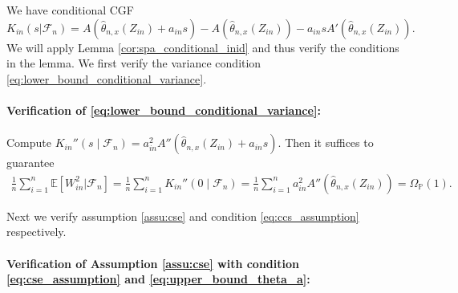 \documentclass[12pt]{article}
\theoremstyle{definition}
\def\P{\mathbb{P}}
\def\P{\mathbb{P}}
\newcommand{\E}{\mathbb E}								%
\renewcommand{\P}{\mathbb{P}}							%
\newcommand{\srz}{Z}									%
\begin{document}
We have conditional CGF 
\begin{equation}
K_{in}(s|\mathcal{F}_n) = A(\widehat \theta_{n,x}(\srz_{in})+a_{in}s)-A(\widehat \theta_{n,x}(\srz_{in}))-a_{in}sA'(\widehat \theta_{n,x}(\srz_{in})).
\end{equation}
We will apply Lemma \ref{cor:spa_conditional_inid} and thus verify the conditions in the lemma. We first verify the variance condition \eqref{eq:lower_bound_conditional_variance}.

\paragraph{\textbf{Verification of \eqref{eq:lower_bound_conditional_variance}}:}
Compute $K_{in}''(s\mid \mathcal{F}_n)= a_{in}^2A''(\widehat \theta_{n,x}(\srz_{in})+a_{in}s)$. Then it suffices to guarantee 
\begin{align*}
  \frac{1}{n}\sum_{i=1}^n \E[W_{in}^2|\mathcal{F}_n]=\frac{1}{n}\sum_{i=1}^n K_{in}''(0\mid \mathcal{F}_n)=\frac{1}{n}\sum_{i=1}^n a_{in}^2A''(\widehat \theta_{n,x}(\srz_{in}))=\Omega_\P(1).
\end{align*}

\noindent Next we verify assumption \ref{assu:cse} and condition \eqref{eq:ccs_assumption} respectively.

\paragraph{Verification of Assumption \ref{assu:cse} with condition \eqref{eq:cse_assumption} and \eqref{eq:upper_bound_theta_a}:} 
\end{document}
